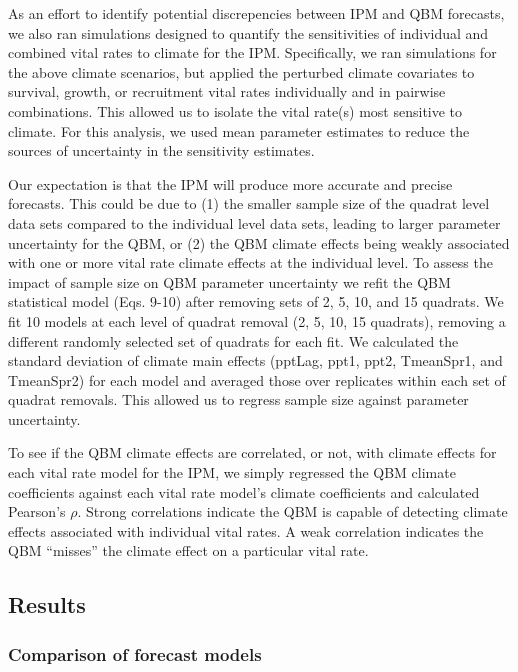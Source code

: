 \documentclass[12pt,]{article}
\begin{document}
As an effort to identify potential discrepencies between IPM and QBM
forecasts, we also ran simulations designed to quantify the
sensitivities of individual and combined vital rates to climate for the
IPM. Specifically, we ran simulations for the above climate scenarios,
but applied the perturbed climate covariates to survival, growth, or
recruitment vital rates individually and in pairwise combinations. This
allowed us to isolate the vital rate(s) most sensitive to climate. For
this analysis, we used mean parameter estimates to reduce the sources of
uncertainty in the sensitivity estimates.

Our expectation is that the IPM will produce more accurate and precise
forecasts. This could be due to (1) the smaller sample size of the
quadrat level data sets compared to the individual level data sets,
leading to larger parameter uncertainty for the QBM, or (2) the QBM
climate effects being weakly associated with one or more vital rate
climate effects at the individual level. To assess the impact of sample
size on QBM parameter uncertainty we refit the QBM statistical model
(Eqs. 9-10) after removing sets of 2, 5, 10, and 15 quadrats. We fit 10
models at each level of quadrat removal (2, 5, 10, 15 quadrats),
removing a different randomly selected set of quadrats for each fit. We
calculated the standard deviation of climate main effects (pptLag, ppt1,
ppt2, TmeanSpr1, and TmeanSpr2) for each model and averaged those over
replicates within each set of quadrat removals. This allowed us to
regress sample size against parameter uncertainty.

To see if the QBM climate effects are correlated, or not, with climate
effects for each vital rate model for the IPM, we simply regressed the
QBM climate coefficients against each vital rate model's climate
coefficients and calculated Pearson's $\rho$. Strong correlations
indicate the QBM is capable of detecting climate effects associated with
individual vital rates. A weak correlation indicates the QBM ``misses''
the climate effect on a particular vital rate.

\subsection{Results}\label{results}

\subsubsection{Comparison of forecast
models}\label{comparison-of-forecast-models}
\end{document}
